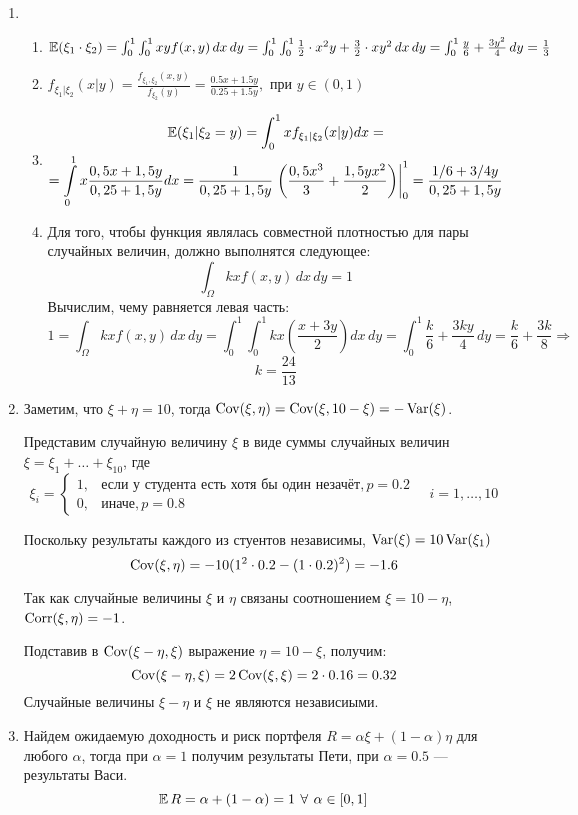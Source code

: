 \begin{enumerate}
\item
\begin{enumerate}
\item $ \operatorname{\mathbb{E}}({\xi_1 \cdot \xi_2}) = \int_{0}^1 \int_0^1 xy f(x,y) \, dx \, dy = \int_0^1 \int_0^1 \frac{1}{2}\cdot x^2y + \frac{3}{2}\cdot xy^2 \, dx \, dy = \int_{0}^1 \frac{y}{6} + \frac{3y^2}{4} \,dy = \frac{1}{3}$
\item $f_{\xi_1 | \xi_2} (x | y) = \frac{f_{\xi_1, \xi_2}(x, y)}{f_{\xi_2}(y)} = \frac{0.5x + 1.5y}{0.25 + 1.5y}, \text{ при } y \in (0,1)$
\item
\begin{multline*}
\operatorname{\mathbb{E}}(\xi_1 | \xi_2 = y) = \int_0^1 x f_{\xi_1 | \xi_2} (x | y) dx = \\
= \int\limits_{0}^{1}  x \frac{0,5x + 1,5y}{0,25 + 1,5y} dx = \frac{1}{0,25 + 1,5y}  \left. \left( \dfrac{0,5x^3}{3} +  \dfrac{1,5yx^2}{2} \right) \right|_0^1  =  \frac{1/6 + 3/4y}{0,25 + 1,5y}
\end{multline*}
\item
Для того, чтобы функция являлась совместной плотностью для пары случайных величин, должно выполнятся следующее:
\[
\int_{\Omega} kx f(x,y) \, dx \, dy = 1
\]
Вычислим, чему равняется левая часть:
\[
1 = \int_{\Omega} kx f(x,y) \, dx \, dy = \int_{0}^1 \int_{0}^1 kx \left(\frac{x + 3y}{2}\right) dx \, dy = \int_{0}^1 \frac{k}{6} + \frac{3ky}{4} \, dy = \frac{k}{6} + \frac{3k}{8} \Rightarrow
\]
\[
k = \frac{24}{13}
\]
\end{enumerate}
\item Заметим, что $\xi + \eta = 10$, тогда $\operatorname{Cov}(\xi, \eta) = \operatorname{Cov}(\xi, 10-\xi) = -\operatorname{Var}(\xi)$.

Представим случайную величину $\xi$ в виде суммы случайных величин $\xi = \xi_1 + \ldots + \xi_{10}$, где
\[
\xi_i = \begin{cases}
1, & \text{если у студента есть хотя бы один незачёт}, p=0.2 \\
0, & \text{иначе}, p=0.8
\end{cases} \quad i = 1, \ldots, 10
\]

Поскольку результаты каждого из стуентов независимы, $\operatorname{Var}(\xi) = 10\operatorname{Var}(\xi_1)$
\[
\operatorname{Cov}(\xi, \eta) = -10(1^2 \cdot 0.2 - (1\cdot 0.2)^2) = -1.6
\]

Так как случайные величины $\xi$ и $\eta$ связаны соотношением $\xi = 10 - \eta$, $\operatorname{Corr}(\xi, \eta)=-1$.

Подставив в $\operatorname{Cov}(\xi - \eta, \xi)$ выражение $\eta = 10 - \xi$, получим:
\[
\operatorname{Cov}(\xi - \eta, \xi) = 2 \operatorname{Cov}(\xi, \xi) = 2 \cdot 0.16 = 0.32
\]
Случайные величины $\xi - \eta$ и $\xi$ не являются независиыми.
\item Найдем ожидаемую доходность и риск портфеля $R = \alpha \xi + (1-\alpha) \eta$ для любого $\alpha$, тогда при $\alpha = 1$ получим результаты Пети, при $\alpha = 0.5$ — результаты Васи.
\[
\operatorname{\mathbb{E}} R = \alpha + (1-\alpha) = 1 \: \, \forall \, \: \alpha \in [0,1]
\]


\end{enumerate}
